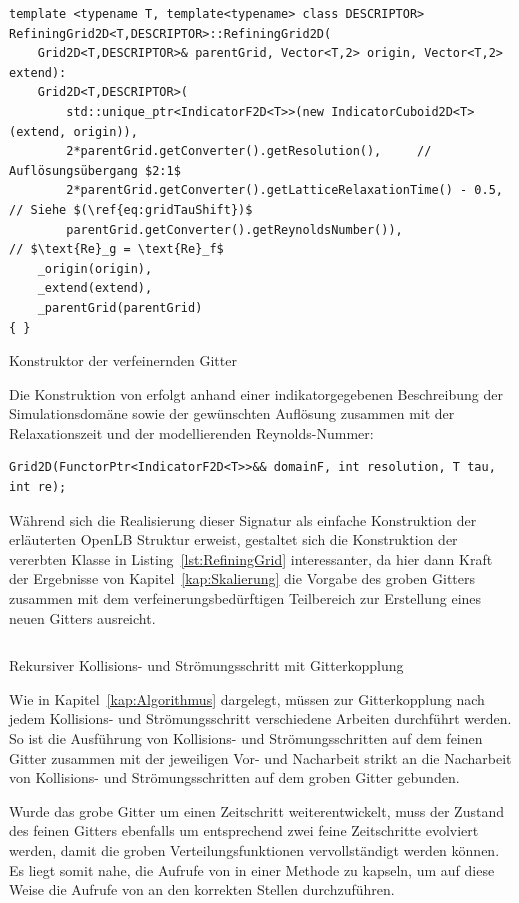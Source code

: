 \begin{listing}[H]
\begin{verbatim}
template <typename T, template<typename> class DESCRIPTOR>
RefiningGrid2D<T,DESCRIPTOR>::RefiningGrid2D(
	Grid2D<T,DESCRIPTOR>& parentGrid, Vector<T,2> origin, Vector<T,2> extend):
	Grid2D<T,DESCRIPTOR>(
		std::unique_ptr<IndicatorF2D<T>>(new IndicatorCuboid2D<T>(extend, origin)),
		2*parentGrid.getConverter().getResolution(),     // Auflösungsübergang $2:1$
		2*parentGrid.getConverter().getLatticeRelaxationTime() - 0.5, // Siehe $(\ref{eq:gridTauShift})$
		parentGrid.getConverter().getReynoldsNumber()),               // $\text{Re}_g = \text{Re}_f$
	_origin(origin),
	_extend(extend),
	_parentGrid(parentGrid)
{ }
\end{verbatim}
\caption{Konstruktor der verfeinernden Gitter}
\label{lst:RefiningGrid}
\end{listing}

Die Konstruktion von  erfolgt anhand einer indikatorgegebenen Beschreibung der Simulationsdomäne sowie der gewünschten Auflösung zusammen mit der Relaxationszeit und der modellierenden Reynolds-Nummer:
\begin{verbatim}
Grid2D(FunctorPtr<IndicatorF2D<T>>&& domainF, int resolution, T tau, int re);
\end{verbatim}
Während sich die Realisierung dieser Signatur als einfache Konstruktion der erläuterten OpenLB Struktur erweist, gestaltet sich die Konstruktion der vererbten  Klasse in Listing~\ref{lst:RefiningGrid} interessanter, da hier dann Kraft der Ergebnisse von Kapitel~\ref{kap:Skalierung} die Vorgabe des groben Gitters zusammen mit dem verfeinerungsbedürftigen Teilbereich zur Erstellung eines neuen Gitters ausreicht.

\begin{listing}[H]
\inputminted{cpp}{code/grid2d_collide_and_stream.cpp}
\caption{Rekursiver Kollisions- und Strömungsschritt mit Gitterkopplung}
\label{lst:GridCollideAndStream}
\end{listing}

Wie in Kapitel~\ref{kap:Algorithmus} dargelegt, müssen zur Gitterkopplung nach jedem Kollisions- und Strömungsschritt verschiedene Arbeiten durchführt werden. So ist die Ausführung von Kollisions- und Strömungsschritten auf dem feinen Gitter zusammen mit der jeweiligen Vor- und Nacharbeit strikt an die Nacharbeit von Kollisions- und Strömungsschritten auf dem groben Gitter gebunden.

Wurde das grobe Gitter um einen Zeitschritt weiterentwickelt, muss der Zustand des feinen Gitters ebenfalls um entsprechend zwei feine Zeitschritte evolviert werden, damit die groben Verteilungsfunktionen vervollständigt werden können. Es liegt somit nahe, die Aufrufe von  in einer  Methode zu kapseln, um auf diese Weise die Aufrufe von  an den korrekten Stellen durchzuführen.

